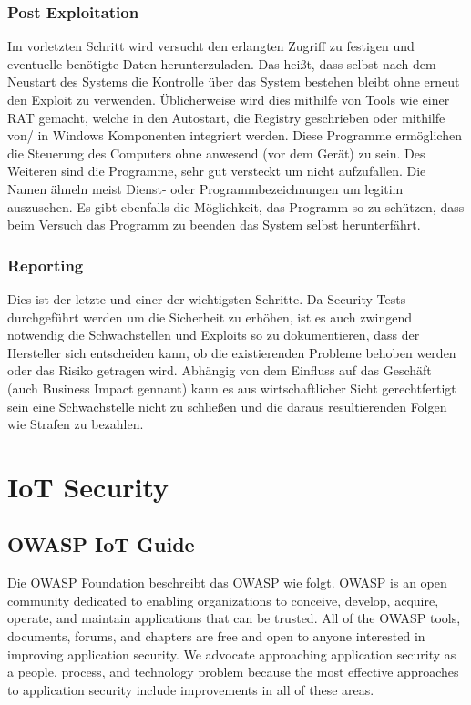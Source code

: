     \subsubsection{\glqq Post Exploitation\grqq{}}
        Im vorletzten Schritt wird versucht den erlangten Zugriff zu festigen und eventuelle benötigte Daten herunterzuladen. Das heißt, dass selbst nach dem Neustart des Systems die Kontrolle über das System bestehen bleibt ohne erneut den Exploit zu verwenden. Üblicherweise wird dies mithilfe von Tools wie einer \ac{RAT} gemacht, welche in den Autostart, die Registry geschrieben oder mithilfe von/ in Windows Komponenten integriert werden.
        Diese Programme ermöglichen die Steuerung des Computers ohne anwesend (vor dem Gerät) zu sein. Des Weiteren sind die Programme, sehr gut versteckt um nicht aufzufallen. Die Namen ähneln meist Dienst- oder Programmbezeichnungen um legitim auszusehen. Es gibt ebenfalls die Möglichkeit, das Programm so zu schützen, dass beim Versuch das Programm zu beenden das System selbst herunterfährt.
    \subsubsection{\glqq Reporting\grqq{}}
        Dies ist der letzte und einer der wichtigsten Schritte. Da Security Tests durchgeführt werden um die Sicherheit zu erhöhen, ist es auch zwingend notwendig die Schwachstellen und Exploits so zu dokumentieren, dass der Hersteller sich entscheiden kann, ob die existierenden Probleme behoben werden oder das Risiko getragen wird. Abhängig von dem Einfluss auf das Geschäft (auch Business Impact gennant) kann es aus wirtschaftlicher Sicht gerechtfertigt sein eine Schwachstelle nicht zu schließen und die daraus resultierenden Folgen wie Strafen zu bezahlen.

\section{IoT Security}
    \subsection{OWASP IoT Guide}
        Die OWASP Foundation \cite{guzman_2019} beschreibt das \ac{OWASP} wie folgt.
        \glqq OWASP is an open community dedicated to enabling organizations to conceive, develop, acquire, operate, and maintain applications that can be trusted. All of the OWASP tools, documents, forums, and chapters are free and open to anyone interested in improving application security. We advocate approaching application security as a people, process, and technology problem because the most effective approaches to application security include improvements in all of these areas.\grqq{}
        

